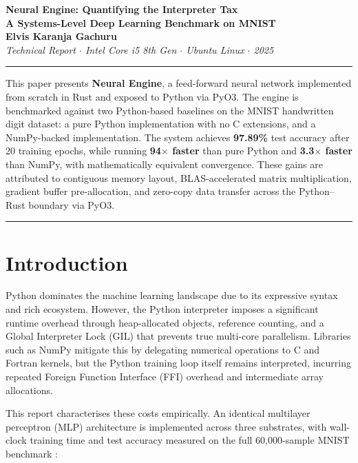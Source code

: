 \documentclass[11pt]{article}
\renewenvironment{abstract}
 {\vspace{4pt}%
  \noindent\rule{\linewidth}{0.4pt}\vspace{4pt}%
  \small\setlength{\parskip}{5pt}\setlength{\parindent}{0pt}%
  \begin{center}{\bfseries\abstractname}\end{center}%
  \vspace{2pt}%
  \list{}{%
    \setlength{\leftmargin}{0.45in}%
    \setlength{\rightmargin}{\leftmargin}%
    \setlength{\topsep}{0pt}%
    \setlength{\partopsep}{0pt}%
  }%
  \item\relax}
 {\endlist\vspace{4pt}\noindent\rule{\linewidth}{0.4pt}}
\begin{document}
\begin{center}
  {\LARGE\bfseries Neural Engine: Quantifying the Interpreter Tax\\[4pt]
  \large A Systems-Level Deep Learning Benchmark on MNIST}\\[12pt]
  {\normalsize\textbf{Elvis Karanja Gachuru}}\\[4pt]
  {\small\textit{Technical Report $\cdot$ Intel Core i5 8th Gen $\cdot$ Ubuntu Linux $\cdot$ 2025}}\\[16pt]
\end{center}

\begin{abstract}
This paper presents \textbf{Neural Engine}, a feed-forward neural network implemented from scratch in Rust and exposed to Python via PyO3. The engine is benchmarked against two Python-based baselines on the MNIST handwritten digit dataset: a pure Python implementation with no C extensions, and a NumPy-backed implementation. The system achieves \textbf{97.89\%} test accuracy after 20 training epochs, while running \textbf{94$\times$ faster} than pure Python and \textbf{3.3$\times$ faster} than NumPy, with mathematically equivalent convergence. These gains are attributed to contiguous memory layout, BLAS-accelerated matrix multiplication, gradient buffer pre-allocation, and zero-copy data transfer across the Python--Rust boundary via PyO3.
\end{abstract}

\vspace{14pt}

\section{Introduction}

Python dominates the machine learning landscape due to its expressive syntax and rich ecosystem. However, the Python interpreter imposes a significant runtime overhead through heap-allocated objects, reference counting, and a Global Interpreter Lock (GIL) that prevents true multi-core parallelism. Libraries such as NumPy mitigate this by delegating numerical operations to C and Fortran kernels, but the Python training loop itself remains interpreted, incurring repeated Foreign Function Interface (FFI) overhead and intermediate array allocations.

This report characterises these costs empirically. An identical multilayer perceptron (MLP) architecture is implemented across three substrates, with wall-clock training time and test accuracy measured on the full 60{,}000-sample MNIST benchmark \cite{lecun1998}:
\end{document}
